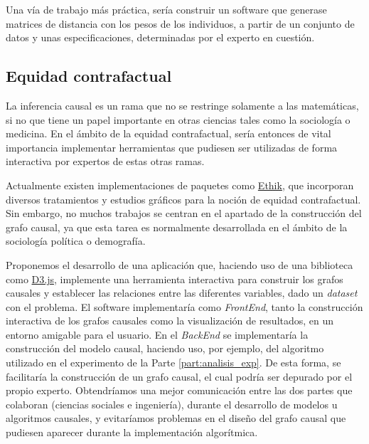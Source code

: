 \documentclass[oneside,openright,titlepage,numbers=noenddot,openany,headinclude,footinclude=true,
cleardoublepage=empty,abstractoff,BCOR=5mm,paper=a4,fontsize=12pt,main=spanish]{scrreprt}
\begin{document}
Una vía de trabajo más práctica, sería construir un software que generase matrices de distancia con los pesos de los individuos, a partir de un conjunto de datos y unas especificaciones, determinadas por el experto en cuestión.

\subsection*{Equidad contrafactual}

La inferencia causal es un rama que no se restringe solamente a las matemáticas, si no que tiene un papel importante en otras ciencias tales como la sociología o medicina. En el ámbito de la equidad contrafactual, sería entonces de vital importancia implementar herramientas que pudiesen ser utilizadas de forma interactiva por expertos de estas otras ramas.

Actualmente existen implementaciones de paquetes como \href{https://xai-aniti.github.io/ethik/}{Ethik}, que incorporan diversos tratamientos y estudios gráficos para la noción de equidad contrafactual. Sin embargo, no muchos trabajos se centran en el apartado de la construcción del grafo causal, ya que esta tarea es normalmente desarrollada en el ámbito de la sociología política o demografía.

Proponemos el desarrollo de una aplicación que, haciendo uso de una biblioteca como \href{https://d3js.org/}{D3.js}, implemente una herramienta interactiva para construir los grafos causales y establecer las relaciones entre las diferentes variables, dado un \textit{dataset} con el problema. El software implementaría como \textit{FrontEnd}, tanto la construcción interactiva de los grafos causales como la visualización de resultados, en un entorno amigable para el usuario. En el \textit{BackEnd} se implementaría la construcción del modelo causal, haciendo uso, por ejemplo, del algoritmo utilizado en el experimento de la Parte \ref{part:analisis_exp}. De esta forma, se facilitaría la construcción de un grafo causal, el cual podría ser depurado por el propio experto. Obtendríamos una mejor comunicación entre las dos partes que colaboran (ciencias sociales e ingeniería), durante el desarrollo de modelos u algoritmos causales, y evitaríamos problemas en el diseño del grafo causal que pudiesen aparecer durante la implementación algorítmica.





\end{document}
